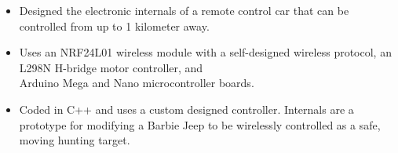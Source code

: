 \documentclass[11pt,letterpaper,ragged2e]{altacv}
\begin{document}
{
\begin{itemize}
    \item Designed the electronic internals of a remote control car that can be controlled from up to 1 kilometer away.
    \item Uses an NRF24L01 wireless module with a self-designed wireless protocol, an L298N H-bridge motor controller, and \\ Arduino Mega and Nano microcontroller boards.
    \item Coded in C++ and uses a custom designed controller. Internals are a prototype for modifying a Barbie Jeep to be wirelessly controlled as a safe, moving hunting target.
\end{itemize}
}
{}

{} \

\clearpage

\nocite{*}
\end{document}
